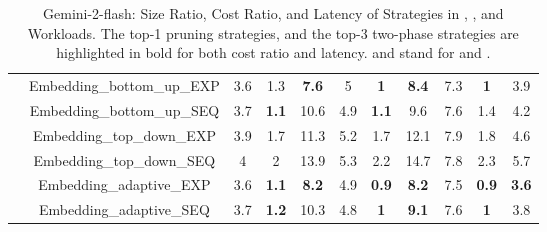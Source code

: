 {\begin{table}[bt]
{\begin{tabular}{|c|c|c|c|c|c|c|c|c|c|c|}
&Embedding\_bottom\_up\_EXP& 3.6 & 1.3 & \textbf{7.6}    & 5 & \textbf{1}& \textbf{8.4} & 7.3 & \textbf{1} & 3.9 \\
&Embedding\_bottom\_up\_SEQ& 3.7 & \textbf{1.1} & 10.6 & 4.9 & \textbf{1.1}& 9.6 & 7.6 & 1.4 & 4.2\\
&Embedding\_top\_down\_EXP& 3.9 & 1.7 & 11.3 & 5.2 & 1.7& 12.1&7.9 & 1.8 & 4.6\\
&Embedding\_top\_down\_SEQ& 4 & 2 & 13.9 &  5.3 & 2.2& 14.7& 7.8 & 2.3 & 5.7\\
&Embedding\_adaptive\_EXP& 3.6 & \textbf{1.1} & \textbf{8.2}    & 4.9 & \textbf{0.9}& \textbf{8.2} & 7.5 & \textbf{0.9} & \textbf{3.6} \\
&Embedding\_adaptive\_SEQ& 3.7 & \textbf{1.2} & 10.3 & 4.8 & \textbf{1}& \textbf{9.1} & 7.6 & \textbf{1} & 3.8\\
\hline
\end{tabular}}
\caption{\small Gemini-2-flash: Size Ratio, Cost Ratio, and Latency of Strategies in , , and  Workloads. The top-1 pruning strategies, and the top-3 two-phase strategies are highlighted in bold for both cost ratio and latency.  and  stand for  and . }
\vspace{-2em}
\label{tab:top-1-gemini}
\end{table}}

